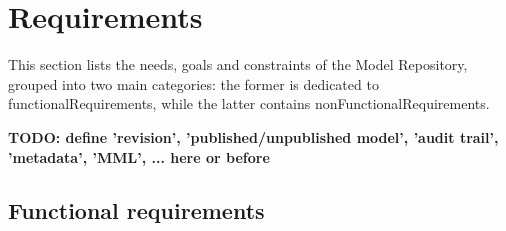 \section{Requirements}
\label{requirements}
This section lists the needs, goals and constraints of the \ddmore Model Repository, grouped into two main categories: the former is dedicated to \glspl{functionalRequirement}, while the latter contains \glspl{nonFunctionalRequirement}. 




\textbf{TODO: define 'revision', 'published/unpublished model', 'audit trail', 'metadata', 'MML', ... here or before}



\subsection{Functional requirements}
\label{functionalRequirements}

